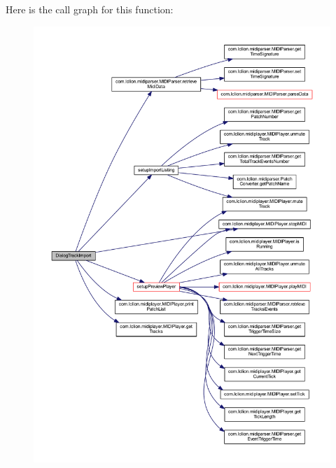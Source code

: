 Here is the call graph for this function\+:\nopagebreak
\begin{figure}[H]
\begin{center}
\leavevmode
\includegraphics[width=350pt]{classcom_1_1lclion_1_1midigui_1_1_dialog_track_import_a2ec034a8f00a81096e52e15c9a4af6a0_cgraph}
\end{center}
\end{figure}




